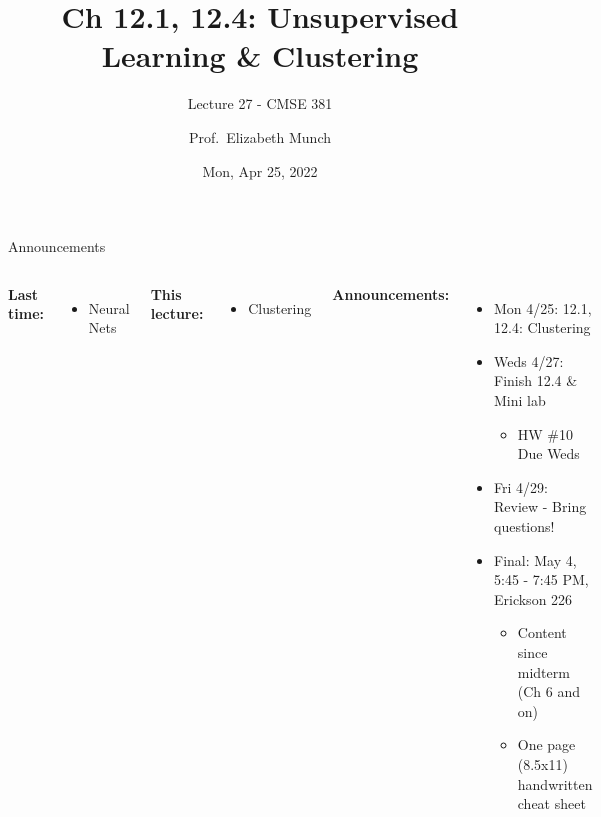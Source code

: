 \documentclass[aspectratio=169,usenames,dvipsnames]{beamer}
\begin{document}
\title[]{Ch 12.1, 12.4: Unsupervised Learning \& Clustering}
\subtitle{Lecture 27 - CMSE 381}
\date{Mon, Apr 25, 2022}



\author[Dr.~Munch]{Prof.~Elizabeth Munch}

\begin{frame}
 \titlepage


\end{frame}
\begin{frame}[c]{Announcements }

\begin{columns}
\centering

	\textbf{Last time:}
	\begin{itemize}
	\item Neural Nets
	\end{itemize}

	\vspace{.2in}

	\textbf{This lecture:}
	\begin{itemize}
		\item Clustering
\end{itemize}


\centering

\textbf{Announcements:}
	\begin{itemize}
	\item Mon 4/25: 12.1, 12.4: Clustering
	\item Weds 4/27: Finish 12.4 \& Mini lab
	\begin{itemize}
		\item HW \#10 Due Weds
	\end{itemize}
	\item Fri 4/29: Review - Bring questions!
	\item Final: May 4, 5:45 - 7:45 PM, Erickson 226
	\begin{itemize}
		\item Content since midterm (Ch 6 and on)
		\item One page (8.5x11) handwritten cheat sheet
	\end{itemize}
	\end{itemize}
\end{columns}

\end{frame}
\end{document}
